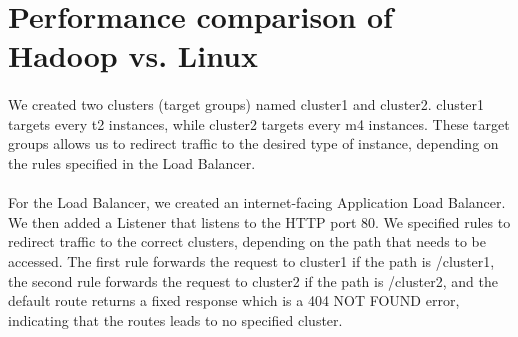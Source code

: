 \section{Performance comparison of Hadoop vs. Linux} \label{T2}

\paragraph{}We created two clusters (target groups) named cluster1 and cluster2. cluster1 targets every t2 instances, while cluster2 targets every m4 instances. These target groups allows us to redirect traffic to the desired type of instance, depending on the rules specified in the Load Balancer.
\paragraph{}For the Load Balancer, we created an internet-facing Application Load Balancer. We then added a Listener that listens to the HTTP port 80. We specified rules to redirect traffic to the correct clusters, depending on the path that needs to be accessed. The first rule forwards the request to cluster1 if the path is /cluster1, the second rule forwards the request to cluster2 if the path is /cluster2, and the default route returns a fixed response which is a 404 NOT FOUND error, indicating that the routes leads to no specified cluster.

